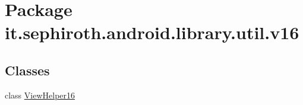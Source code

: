 \hypertarget{namespaceit_1_1sephiroth_1_1android_1_1library_1_1util_1_1v16}{}\section{Package it.\+sephiroth.\+android.\+library.\+util.\+v16}
\label{namespaceit_1_1sephiroth_1_1android_1_1library_1_1util_1_1v16}
\subsection*{Classes}
\begin{DoxyCompactItemize}
\item 
class \hyperlink{classit_1_1sephiroth_1_1android_1_1library_1_1util_1_1v16_1_1_view_helper16}{View\+Helper16}
\end{DoxyCompactItemize}
